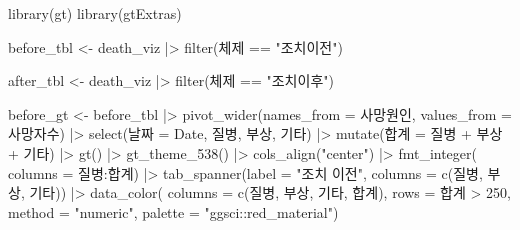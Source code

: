 \documentclass[
  letterpaper,
  chapter,a4paper,showtrims,openright,hidelinks]{oblivoir}
\newenvironment{Shaded}{\begin{snugshade}}{\end{snugshade}}
\newcommand{\AttributeTok}[1]{\textcolor[rgb]{0.40,0.45,0.13}{#1}}
\newcommand{\DecValTok}[1]{\textcolor[rgb]{0.68,0.00,0.00}{#1}}
\newcommand{\FunctionTok}[1]{\textcolor[rgb]{0.28,0.35,0.67}{#1}}
\newcommand{\NormalTok}[1]{\textcolor[rgb]{0.00,0.23,0.31}{#1}}
\newcommand{\OtherTok}[1]{\textcolor[rgb]{0.00,0.23,0.31}{#1}}
\newcommand{\SpecialCharTok}[1]{\textcolor[rgb]{0.37,0.37,0.37}{#1}}
\newcommand{\StringTok}[1]{\textcolor[rgb]{0.13,0.47,0.30}{#1}}
\begin{document}
\begin{Shaded}
\begin{Highlighting}[]
\FunctionTok{library}\NormalTok{(gt)}
\FunctionTok{library}\NormalTok{(gtExtras)}

\NormalTok{before\_tbl }\OtherTok{\textless{}{-}}\NormalTok{ death\_viz }\SpecialCharTok{|\textgreater{}} 
  \FunctionTok{filter}\NormalTok{(체제 }\SpecialCharTok{==} \StringTok{"조치이전"}\NormalTok{)}

\NormalTok{after\_tbl }\OtherTok{\textless{}{-}}\NormalTok{ death\_viz }\SpecialCharTok{|\textgreater{}} 
  \FunctionTok{filter}\NormalTok{(체제 }\SpecialCharTok{==} \StringTok{"조치이후"}\NormalTok{)}

\NormalTok{before\_gt }\OtherTok{\textless{}{-}}\NormalTok{ before\_tbl }\SpecialCharTok{|\textgreater{}} 
  \FunctionTok{pivot\_wider}\NormalTok{(}\AttributeTok{names\_from =}\NormalTok{ 사망원인, }\AttributeTok{values\_from =}\NormalTok{ 사망자수) }\SpecialCharTok{|\textgreater{}} 
  \FunctionTok{select}\NormalTok{(날짜 }\OtherTok{=}\NormalTok{ Date, 질병, 부상, 기타) }\SpecialCharTok{|\textgreater{}} 
  \FunctionTok{mutate}\NormalTok{(합계 }\OtherTok{=}\NormalTok{ 질병 }\SpecialCharTok{+}\NormalTok{ 부상 }\SpecialCharTok{+}\NormalTok{ 기타) }\SpecialCharTok{|\textgreater{}} 
  \FunctionTok{gt}\NormalTok{() }\SpecialCharTok{|\textgreater{}} 
    \FunctionTok{gt\_theme\_538}\NormalTok{() }\SpecialCharTok{|\textgreater{}} 
    \FunctionTok{cols\_align}\NormalTok{(}\StringTok{"center"}\NormalTok{) }\SpecialCharTok{|\textgreater{}} 
    \FunctionTok{fmt\_integer}\NormalTok{( }\AttributeTok{columns =}\NormalTok{ 질병}\SpecialCharTok{:}\NormalTok{합계) }\SpecialCharTok{|\textgreater{}} 
    \FunctionTok{tab\_spanner}\NormalTok{(}\AttributeTok{label =} \StringTok{"조치 이전"}\NormalTok{, }\AttributeTok{columns =} \FunctionTok{c}\NormalTok{(질병, 부상, 기타)) }\SpecialCharTok{|\textgreater{}} 
    \FunctionTok{data\_color}\NormalTok{(}
      \AttributeTok{columns =} \FunctionTok{c}\NormalTok{(질병, 부상, 기타, 합계),}
      \AttributeTok{rows =}\NormalTok{ 합계 }\SpecialCharTok{\textgreater{}} \DecValTok{250}\NormalTok{,      }
      \AttributeTok{method =} \StringTok{"numeric"}\NormalTok{,}
      \AttributeTok{palette =} \StringTok{"ggsci::red\_material"}\NormalTok{)}


\end{Highlighting}
\end{Shaded}
\end{document}
